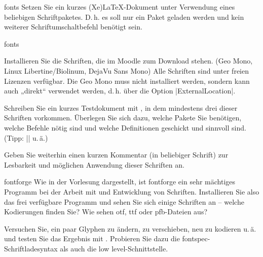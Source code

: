 \documentclass[
	blatt=2,
	ausgabe=23.\,04.\,2010,
	rückgabe=30.\,04.\,2010
]{lcourse-hd}
\begin{document}
\begin{exercise}[name=Erste Schritte mit Schriften,punkte=3,abgabe = Quelltext per Mail{,} das fertige Dokument als Ausdruck.]{fonts}
Setzen Sie ein kurzes (Xe)\LaTeX-Dokument unter Verwendung eines beliebigen Schriftpaketes. D.\,h. es soll nur ein Paket geladen werden und kein weiterer Schriftumschaltbefehl benötigt sein.
\end{exercise}

\begin{exercise}[name=Die nächsten Schriftschritte,punkte=7,abgabe = Quelltext per Mail{,} das fertige Dokument als Ausdruck.]{fonts}

Installieren Sie die Schriften, die im Moodle zum Download stehen. (Geo Mono, Linux Libertine/Biolinum, DejaVu Sans Mono) Alle Schriften sind unter freien Lizenzen verfügbar. Die Geo Mono muss nicht installiert werden, sondern kann auch „direkt“ verwendet werden, d.\,h. über die Option |ExternalLocation|.

Schreiben Sie ein kurzes Testdokument mit \XeLaTeX, in dem mindestens drei dieser Schriften vorkommen. Überlegen Sie sich dazu, welche Pakete Sie benötigen, welche Befehle nötig sind und welche Definitionen geschickt und sinnvoll sind. (Tipp: |\setmainfont| u.\,ä.)

Geben Sie weiterhin einen kurzen Kommentar (in beliebiger Schrift) zur Lesbarkeit und möglichen Anwendung dieser Schriften an.
\end{exercise}

\begin{expertexercise}[
	name=fontforge,
	abgabe = Keine Abgabe nötig.
]{fontforge}
Wie in der Vorlesung dargestellt, ist fontforge ein sehr mächtiges Programm bei der Arbeit mit und Entwicklung von Schriften. Installieren Sie also das frei verfügbare Programm und sehen Sie sich einige Schriften an – welche Kodierungen finden Sie? Wie sehen otf, ttf oder pfb-Dateien aus?

Versuchen Sie, ein paar Glyphen zu ändern, zu verschieben, neu zu kodieren u.\,ä. und testen Sie das Ergebnis mit \XeLaTeX. Probieren Sie dazu die fontspec-Schriftladesyntax als auch die low level-Schnittstelle.
\end{expertexercise}
\end{document}
